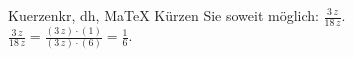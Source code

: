 \begin{MAufgabe}{Kuerzen}{kr, dh, MaTeX}
K\"urzen Sie soweit m\"oglich: $\frac{3\, z}{18\, z}$.\\ 
\ifLsg\MLoesung
\quad $\frac{3\, z}{18\, z}=\frac{(3\, z)\cdot(1)}{(3\, z)\cdot(6)}=\frac{1}{6}$.\else\relax\fi
 \end{MAufgabe}